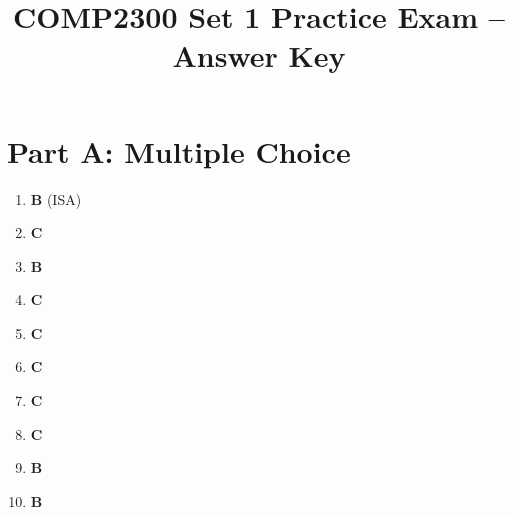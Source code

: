 \documentclass[11pt]{article}
\title{COMP2300 Set 1 Practice Exam -- Answer Key}
\author{}
\date{}
\begin{document}
\maketitle

\section*{Part A: Multiple Choice}
\begin{enumerate}[label=\textbf{A\arabic*.}]
  \item \textbf{B} (ISA)
  \item \textbf{C}
  \item \textbf{B}
  \item \textbf{C}
  \item \textbf{C}
  \item \textbf{C}
  \item \textbf{C}
  \item \textbf{C}
  \item \textbf{B}
  \item \textbf{B}
\end{enumerate}
\end{document}
